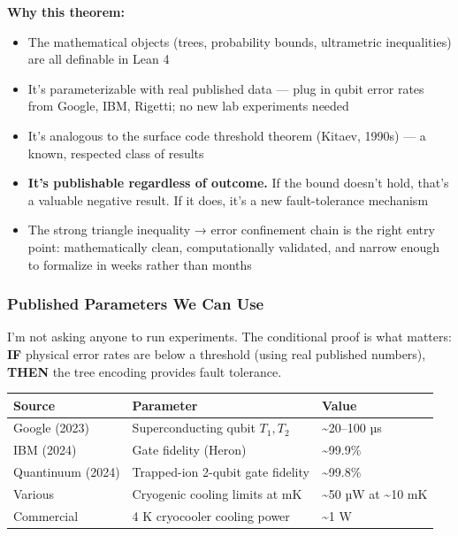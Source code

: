 \documentclass[11pt,a4paper]{article}
\begin{document}
\textbf{Why this theorem:}

\begin{itemize}[nosep]
\item The mathematical objects (trees, probability bounds, ultrametric inequalities) are all definable in Lean 4
\item It's parameterizable with real published data — plug in qubit error rates from Google, IBM, Rigetti; no new lab experiments needed
\item It's analogous to the surface code threshold theorem (Kitaev, 1990s) — a known, respected class of results
\item \textbf{It's publishable regardless of outcome.} If the bound doesn't hold, that's a valuable negative result. If it does, it's a new fault-tolerance mechanism
\item The strong triangle inequality → error confinement chain is the right entry point: mathematically clean, computationally validated, and narrow enough to formalize in weeks rather than months
\end{itemize}

\subsubsection*{Published Parameters We Can Use}

I'm not asking anyone to run experiments. The conditional proof is what matters: \textbf{IF} physical error rates are below a threshold (using real published numbers), \textbf{THEN} the tree encoding provides fault tolerance.

\begin{center}
\begin{longtable}{|l|l|l|}
\hline
\textbf{Source} & \textbf{Parameter} & \textbf{Value} \\ \hline
\endhead
Google (2023) & Superconducting qubit $T_1, T_2$ & \textasciitilde{}20–100 µs \\ \hline
IBM (2024) & Gate fidelity (Heron) & \textasciitilde{}99.9\% \\ \hline
Quantinuum (2024) & Trapped-ion 2-qubit gate fidelity & \textasciitilde{}99.8\% \\ \hline
Various & Cryogenic cooling limits at mK & \textasciitilde{}50 µW at \textasciitilde{}10 mK \\ \hline
Commercial & 4 K cryocooler cooling power & \textasciitilde{}1 W \\ \hline
\end{longtable}
\end{center}
\end{document}
